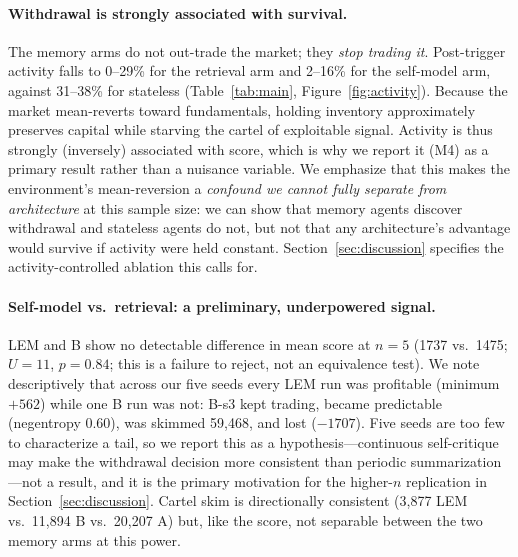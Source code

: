 \documentclass{article}
\begin{document}
\paragraph{Withdrawal is strongly associated with survival.} The memory arms do not out-trade the market; they \emph{stop trading it}. Post-trigger activity falls to 0--29\% for the retrieval arm and 2--16\% for the self-model arm, against 31--38\% for stateless (Table~\ref{tab:main}, Figure~\ref{fig:activity}). Because the market mean-reverts toward fundamentals, holding inventory approximately preserves capital while starving the cartel of exploitable signal. Activity is thus strongly (inversely) associated with score, which is why we report it (M4) as a primary result rather than a nuisance variable. We emphasize that this makes the environment's mean-reversion a \emph{confound we cannot fully separate from architecture} at this sample size: we can show that memory agents discover withdrawal and stateless agents do not, but not that any architecture's advantage would survive if activity were held constant. Section~\ref{sec:discussion} specifies the activity-controlled ablation this calls for.

\paragraph{Self-model vs.\ retrieval: a preliminary, underpowered signal.} LEM and B show no detectable difference in mean score at $n=5$ (1737 vs.\ 1475; $U=11$, $p=0.84$; this is a failure to reject, not an equivalence test). We note descriptively that across our five seeds every LEM run was profitable (minimum $+562$) while one B run was not: B-s3 kept trading, became predictable (negentropy 0.60), was skimmed 59{,}468, and lost ($-1707$). Five seeds are too few to characterize a tail, so we report this as a hypothesis---continuous self-critique may make the withdrawal decision more consistent than periodic summarization---not a result, and it is the primary motivation for the higher-$n$ replication in Section~\ref{sec:discussion}. Cartel skim is directionally consistent (3{,}877 LEM vs.\ 11{,}894 B vs.\ 20{,}207 A) but, like the score, not separable between the two memory arms at this power.
\end{document}
